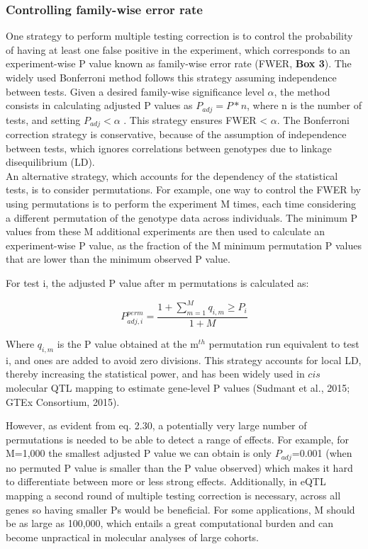 \subsubsection{Controlling family-wise error rate} 

One strategy to perform multiple testing correction is to control the probability of having at least one false positive in the experiment, which corresponds to an experiment-wise P value known as family-wise error rate (FWER, \textbf{Box 3}).
The widely used Bonferroni method follows this strategy assuming independence between tests. 
Given a desired family-wise significance level $\alpha$, the method consists in calculating adjusted P values as $P_{adj} = P*n $, where n is the number of tests, and setting $P_{adj} < \alpha$ . 
This strategy ensures FWER < $\alpha$. 
The Bonferroni correction strategy is conservative, because of the assumption of independence between tests, which ignores correlations between genotypes due to linkage disequilibrium (LD).\\

An alternative strategy, which accounts for the dependency of the statistical tests, is to consider permutations. 
For example, one way to control the FWER by using permutations is to perform the experiment M times, each time considering a different permutation of the genotype data across individuals.
The minimum P values from these M additional experiments are then used to calculate an experiment-wise P value, as the fraction of the M minimum permutation P values that are lower than the minimum observed P value. 

For test i, the adjusted P value after m permutations is calculated as:

\begin{equation}\label{eq19:permutation_adjusted_pvalue}
    P_{adj,i}^{perm} = \frac{1+\sum_{m=1}^{M} q_{i,m} \geq P_i}{1+M}
\end{equation}

Where $q_{i,m}$ is the P value obtained at the m$^{th}$ permutation run equivalent to test i, and ones are added to avoid zero divisions.  
This strategy accounts for local LD, thereby increasing the statistical power, and has been widely used in $cis$ molecular QTL mapping to estimate gene-level P values (Sudmant et al., 2015; GTEx Consortium, 2015).  

However, as evident from eq. 2.30, a potentially very large number of permutations is needed to be able to detect a range of effects.
For example, for M=1,000 the smallest adjusted P value we can obtain is only $P_{adj}$=0.001 (when no permuted P value is smaller than the P value observed) which makes it hard to differentiate between more or less strong effects.
Additionally, in eQTL mapping a second round of multiple testing correction is necessary, across all genes so having smaller Ps would be beneficial.
For some applications, M should be as large as 100,000, which entails a great computational burden and can become unpractical in molecular analyses of large cohorts.\\

